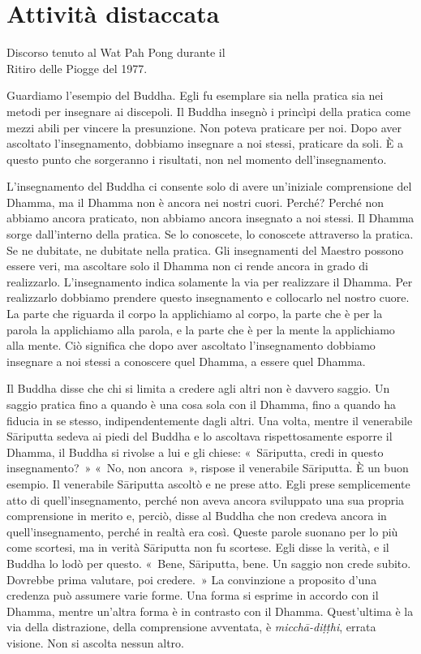 \chapter{Attività distaccata}

\begin{openingQuote}
  \centering

  Discorso tenuto al Wat Pah Pong durante il\\
  Ritiro delle Piogge del 1977.
\end{openingQuote}

Guardiamo l'esempio del Buddha. Egli fu esemplare sia nella pratica sia
nei metodi per insegnare ai discepoli. Il Buddha insegnò i princìpi
della pratica come mezzi abili per vincere la presunzione. Non poteva
praticare per noi. Dopo aver ascoltato l'insegnamento, dobbiamo
insegnare a noi stessi, praticare da soli. È a questo punto che
sorgeranno i risultati, non nel momento dell'insegnamento.

L'insegnamento del Buddha ci consente solo di avere un'iniziale
comprensione del Dhamma, ma il Dhamma non è ancora nei nostri cuori.
Perché? Perché non abbiamo ancora praticato, non abbiamo ancora
insegnato a noi stessi. Il Dhamma sorge dall'interno della pratica. Se
lo conoscete, lo conoscete attraverso la pratica. Se ne dubitate, ne
dubitate nella pratica. Gli insegnamenti del Maestro possono essere
veri, ma ascoltare solo il Dhamma non ci rende ancora in grado di
realizzarlo. L'insegnamento indica solamente la via per realizzare il
Dhamma. Per realizzarlo dobbiamo prendere questo insegnamento e
collocarlo nel nostro cuore. La parte che riguarda il corpo la
applichiamo al corpo, la parte che è per la parola la applichiamo alla
parola, e la parte che è per la mente la applichiamo alla mente. Ciò
significa che dopo aver ascoltato l'insegnamento dobbiamo insegnare a
noi stessi a conoscere quel Dhamma, a essere quel Dhamma.

Il Buddha disse che chi si limita a credere agli altri non è davvero
saggio. Un saggio pratica fino a quando è una cosa sola con il Dhamma,
fino a quando ha fiducia in se stesso, indipendentemente dagli altri.
Una volta, mentre il venerabile Sāriputta sedeva ai piedi del Buddha e
lo ascoltava rispettosamente esporre il Dhamma, il Buddha si rivolse a
lui e gli chiese: «~Sāriputta, credi in questo insegnamento?~» «~No, non
ancora~», rispose il venerabile Sāriputta. È un buon esempio. Il
venerabile Sāriputta ascoltò e ne prese atto. Egli prese semplicemente
atto di quell'insegnamento, perché non aveva ancora sviluppato una sua
propria comprensione in merito e, perciò, disse al Buddha che non
credeva ancora in quell'insegnamento, perché in realtà era così. Queste
parole suonano per lo più come scortesi, ma in verità Sāriputta non fu
scortese. Egli disse la verità, e il Buddha lo lodò per questo. «~Bene,
Sāriputta, bene. Un saggio non crede subito. Dovrebbe prima valutare,
poi credere.~» La convinzione a proposito d'una credenza può assumere
varie forme. Una forma si esprime in accordo con il Dhamma, mentre
un'altra forma è in contrasto con il Dhamma. Quest'ultima è la via della
distrazione, della comprensione avventata, è \emph{micchā-diṭṭhi},
errata visione. Non si ascolta nessun altro.

